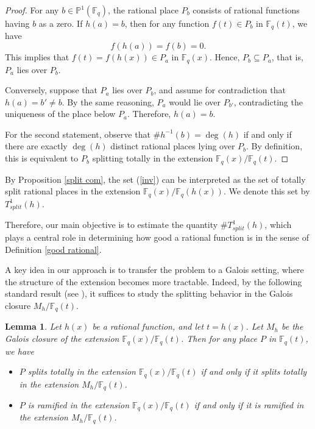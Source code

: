 \documentclass[1p,final]{elsarticle}
\newtheorem{lemma}[theorem]{Lemma}
\newtheorem{open problem}[theorem]{Open Problem}
\begin{document}
\begin{proof}
For any $b\in\mathbb{P}^{1}(\mathbb{F}_{q})$, the rational place $P_{b}$ consists of rational functions having $b$ as a zero. If $h(a)=b$, then for any function $f(t)\in P_{b}$ in $\mathbb{F}_{q}(t)$, we have
\begin{equation}
f(h(a))=f(b)=0.
\end{equation}
This implies that $f(t)=f(h(x))\in P_{a}$ in $\mathbb{F}_{q}(x)$. Hence, $P_{b}\subseteq P_{a}$, that is, $P_{a}$ lies over $P_{b}$.

Conversely, suppose that $P_{a}$ lies over $P_{b}$, and assume for contradiction that $h(a)=b'\ne b$. By the same reasoning, $P_{a}$ would lie over $P_{b'}$, contradicting the uniqueness of the place below $P_{a}$. Therefore, $h(a)=b$.

\medskip

For the second statement, observe that $\# h^{-1}(b)=\deg(h)$ if and only if there are exactly $\deg(h)$ distinct rational places lying over $P_{b}$. By definition, this is equivalent to $P_{b}$ splitting totally in the extension $\mathbb{F}_q(x)/\mathbb{F}_q(t)$.
\end{proof}
	
	
	
	By Proposition \ref{split com}, the set (\ref{inv}) can be interpreted as the set of totally split rational places in the extension $\mathbb{F}_q(x)/\mathbb{F}_q(h(x))$. We denote this set by $T^1_{split}(h)$. 

\medskip

Therefore, our main objective is to estimate the quantity $\#T^1_{split}(h)$, which plays a central role in determining how good a rational function is in the sense of Definition \ref{good rational}. 

\medskip

A key idea in our approach is to transfer the problem to a Galois setting, where the structure of the extension becomes more tractable. Indeed, by the following standard result (see \cite{Stichtenoth2009}), it suffices to study the splitting behavior in the Galois closure $M_{h}/\mathbb{F}_q(t)$.

\begin{lemma}\label{M}
Let $h(x)$ be a rational function, and let $t=h(x)$. Let $M_{h}$ be the Galois closure of the extension $\mathbb{F}_q(x)/\mathbb{F}_q(t)$. Then for any place $P$ in $\mathbb{F}_{q}(t)$, we have
\begin{itemize}
\item[(i)] $P$ splits totally in the extension $\mathbb{F}_q(x)/\mathbb{F}_q(t)$ if and only if it splits totally in the extension $M_{h}/\mathbb{F}_q(t)$. 
\item[(ii)] $P$ is ramified in the extension $\mathbb{F}_q(x)/\mathbb{F}_q(t)$ if and only if it is ramified in the extension $M_{h}/\mathbb{F}_q(t)$. 
\end{itemize}
\end{lemma}
\end{document}
